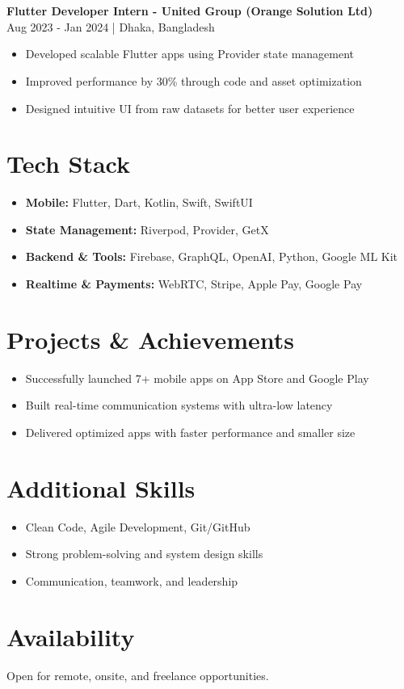 \documentclass[a4paper,10pt]{article}
\newcommand{\sectionunderline}[1]{\section*{#1}\uline{\hfill}}
\begin{document}
\sectionunderline{}
\textbf{Flutter Developer Intern - United Group (Orange Solution Ltd)} \\
Aug 2023 - Jan 2024 | Dhaka, Bangladesh
\vspace{-0.2cm}

\begin{itemize} \setlength\itemsep{-0.2em}
    \item Developed scalable Flutter apps using Provider state management
    \item Improved performance by 30\% through code and asset optimization
    \item Designed intuitive UI from raw datasets for better user experience
\end{itemize}

\sectionunderline{Tech Stack}

\begin{itemize}
    \item \textbf{Mobile:} Flutter, Dart, Kotlin, Swift, SwiftUI
    \item \textbf{State Management:} Riverpod, Provider, GetX
    \item \textbf{Backend \& Tools:} Firebase, GraphQL, OpenAI, Python, Google ML Kit
    \item \textbf{Realtime \& Payments:} WebRTC, Stripe, Apple Pay, Google Pay
\end{itemize}

\sectionunderline{Projects \& Achievements}

\begin{itemize}
    \item Successfully launched 7+ mobile apps on App Store and Google Play
    \item Built real-time communication systems with ultra-low latency
    \item Delivered optimized apps with faster performance and smaller size
\end{itemize}

\sectionunderline{Additional Skills}

\begin{itemize}
    \item Clean Code, Agile Development, Git/GitHub
    \item Strong problem-solving and system design skills
    \item Communication, teamwork, and leadership
\end{itemize}

\sectionunderline{Availability}
Open for remote, onsite, and freelance opportunities.
\end{document}
